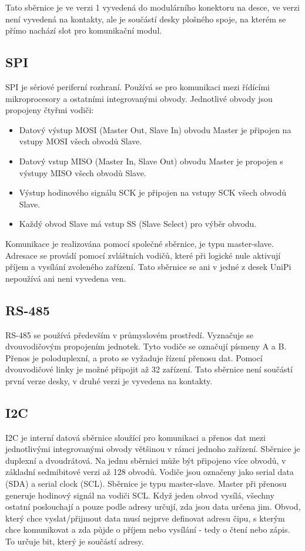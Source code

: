 Tato sběrnice je ve verzi 1 vyvedená do modulárního konektoru na desce, ve verzi není vyvedená na kontakty, ale je součástí desky plošného spoje, na kterém se přímo nachází slot pro komunikační modul.




\subsection{SPI}
SPI je sériové periferní rozhraní. Používá se pro komunikaci mezi řídícími mikroprocesory a ostatními integrovanými obvody. Jednotlivé obvody jsou propojeny čtyřmi vodiči:
\begin{itemize}
	\item Datový výstup MOSI (Master Out, Slave In) obvodu Master je připojen na vstupy MOSI všech obvodů Slave.
	\item Datový vstup MISO (Master In, Slave Out) obvodu Master je propojen s výstupy MISO všech obvodů Slave.
	\item Výstup hodinového signálu SCK je připojen na vstupy SCK všech obvodů Slave.
	\item Každý obvod Slave má vstup SS (Slave Select) pro výběr obvodu.
\end{itemize}
Komunikace je realizována pomocí společné sběrnice, je typu master-slave. Adresace se provádí pomocí zvláštních vodičů, které při logické nule aktivují příjem a vysílání zvoleného zařízení. Tato sběrnice se ani v jedné z desek UniPi nepoužívá ani neni vyvedena ven.

\subsection{RS-485}
RS-485 se používá především v průmyslovém prostředí. Vyznačuje se dvouvodičovým propojením jednotek. Tyto vodiče se označují písmeny A a B. Přenos je poloduplexní, a proto se vyžaduje řízení přenosu dat. Pomocí dvouvodičové linky je možné připojit až 32 zařízení. Tato sběrnice není součástí první verze desky, v druhé verzi je vyvedena na kontakty.

\subsection{I2C}
I2C je interní datová sběrnice sloužící pro komunikaci a přenos dat mezi jednotlivými integrovanými obvody většinou v rámci jednoho zařízení. Sběrnice je duplexní a dvoudrátová. Na jednu sběrnici může být připojeno více obvodů, v základní sedmibitové verzi až 128 obvodů.
Vodiče jsou označeny jako serial data (SDA) a serial clock (SCL). Sběrnice je typu master-slave. Master při přenosu generuje hodinový signál na vodiči SCL. Když jeden obvod vysílá, všechny ostatní poslouchají a pouze podle adresy určují, zda jsou data určena jim. Obvod, který chce vyslat/přijmout data musí nejprve definovat adresu čipu, s kterým chce komunikovat a zda půjde o příjem nebo vysílání - tedy o čtení nebo zápis. To určuje bit, který je součástí adresy. 

